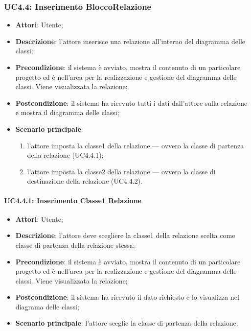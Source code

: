 \subsubsection{UC4.4: Inserimento BloccoRelazione}
\label{UC4.4}
\begin{itemize}
	\item \textbf{Attori}: Utente;
	\item \textbf{Descrizione}: l'attore inserisce una relazione all'interno del diagramma delle classi;
	\item \textbf{Precondizione}: il sistema è avviato, mostra il contenuto di un particolare progetto ed è nell'area per la realizzazione e gestione del diagramma delle classi. Viene visualizzata la relazione;
	\item \textbf{Postcondizione}: il sistema ha ricevuto tutti i dati dall'attore sulla relazione e mostra il diagramma delle classi;
	\item \textbf{Scenario principale}:
	\begin{enumerate}
		\item l'attore imposta la classe1 della relazione --- ovvero la classe di partenza della relazione (UC4.4.1);
		\item l'attore imposta la classe2 della relazione --- ovvero la classe di destinazione della relazione (UC4.4.2).
	\end{enumerate}
\end{itemize}

\paragraph{UC4.4.1: Inserimento Classe1 Relazione}
\label{UC4.4.2}
\begin{itemize}
	\item \textbf{Attori}: Utente;
	\item \textbf{Descrizione}: l'attore deve scegliere la classe1 della relazione scelta come classe di partenza della relazione stessa;
	\item \textbf{Precondizione}: il sistema è avviato, mostra il contenuto di un particolare progetto ed è nell'area per la realizzazione e gestione del diagramma delle classi. Viene visualizzata la relazione;
	\item \textbf{Postcondizione}: il sistema ha ricevuto il dato richiesto e lo visualizza nel diagrama delle classi;
	\item \textbf{Scenario principale}: l'attore sceglie la classe di partenza della relazione.
\end{itemize}

